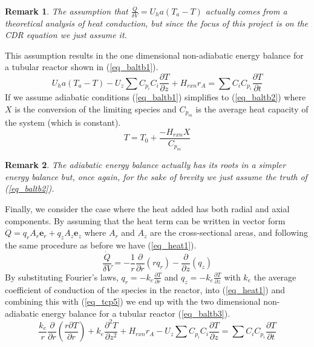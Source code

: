 \documentclass[11pt,fleqn]{article}
\theoremstyle{defstyle}
\newtheorem{rmrk}{Remark}[section]
\begin{document}
\begin{rmrk}
The assumption that $\frac{\dot{Q}}{\delta V} = U_ha(T_a-T)$ actually comes from a theoretical analysis of heat conduction, but since the focus of this project is on the CDR equation we just assume it. 
\end{rmrk} 
This assumption results in the one dimensional non-adiabatic energy balance for a tubular reactor shown in (\ref{eq_baltb1}).
\begin{equation}
U_ha(T_a-T) - U_z\sum C_{p_i}C_i \frac{\partial T}{\partial z} + H_{rxn}r_A = \sum C_i C_{p_i} \frac{\partial T}{\partial t}
\label{eq_baltb1}
\end{equation}
If we assume adiabatic conditions (\ref{eq_baltb1}) simplifies to (\ref{eq_baltb2}) where $X$ is the conversion of the limiting species and $C_{p_m}$ is the average heat capacity of the system (which is constant).
\begin{equation}
T = T_0 + \frac{-H_{rxn}X}{C_{p_m}}
\label{eq_baltb2}
\end{equation}
\begin{rmrk}
The adiabatic energy balance actually has its roots in a simpler energy balance but, once again, for the sake of brevity we just assume the truth of (\ref{eq_baltb2}).
\end{rmrk}
Finally, we consider the case where the heat added has both radial and axial components. By assuming that the heat term can be written in vector form $\dot{Q} = q_r A_r \mathbf{e}_r + q_z A_z \mathbf{e}_z$  where $A_r$ and $A_z$ are the cross-sectional areas, and following the same procedure as before we have (\ref{eq_heat1}).
\begin{equation}
\frac{\dot{Q}}{\delta V} = -\frac{1}{r}\frac{\partial}{\partial r}\left(r q_r\right) - \frac{\partial}{\partial z}\left(q_z\right)
\label{eq_heat1}
\end{equation}
By substituting Fourier's laws, $q_r = -k_e\frac{\partial T}{\partial r}$ and $q_z = -k_e\frac{\partial T}{\partial z}$ with $k_e$ the average coefficient of conduction of the species in the reactor, into (\ref{eq_heat1}) and combining this with (\ref{eq_tcp5}) we end up with the two dimensional non-adiabatic energy balance for a tubular reactor (\ref{eq_baltb3}).
\begin{equation}
\frac{k_e}{r}\frac{\partial}{\partial r}\left(\frac{r\partial T}{\partial r}\right) + k_e\frac{\partial ^2 T}{\partial z^2} + H_{rxn}r_A - U_z\sum C_{p_i}C_i \frac{\partial T}{\partial z} =\sum C_i C_{p_i} \frac{\partial T}{\partial t}
\label{eq_baltb3}
\end{equation}
\end{document}
